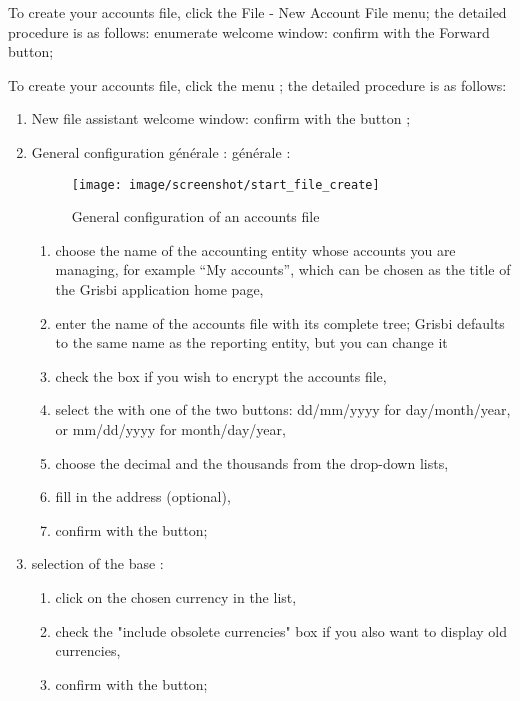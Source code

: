 To create your accounts file, click the File - New Account File menu; the detailed procedure is as follows:
enumerate
welcome window: confirm with the Forward button;

To create your accounts file, click the  menu ; the detailed procedure is as follows:

\begin{enumerate}
\item New file assistant welcome window: confirm with the  button ;
\item General configuration
\ifIllustration générale :
\else générale :
\fi

\ifIllustration
\begin{figure}[htbp]
\begin{center}
\texttt{[image: image/screenshot/start\_file\_create]}
\end{center}
\caption{General configuration of an accounts file}
\label{start-file-create-img}
\end{figure}
\fi

\begin{enumerate} 
 \item choose the name of the accounting entity whose accounts you are managing, for example \enquote{My accounts}, which can be chosen as the title of the Grisbi application home page,
\item enter the name of the accounts file with its complete tree; Grisbi defaults to the same name as the reporting entity, but you can change it
\item check the   box if you wish to \gls{encrypt} the accounts file,
\item select the  with one of the two buttons: dd/mm/yyyy for day/month/year, or  mm/dd/yyyy for month/day/year,
\item choose the decimal  and the thousands from the drop-down lists,
 \item fill in the address (optional),
 \item  confirm with the   button;
\end{enumerate}

\item selection of the base  :
\begin{enumerate} 
 \item click on the chosen currency in the list,
\item check the "include obsolete currencies" box if you also want to display old currencies,
\item confirm with the  button;
\end{enumerate}


\end{enumerate}
